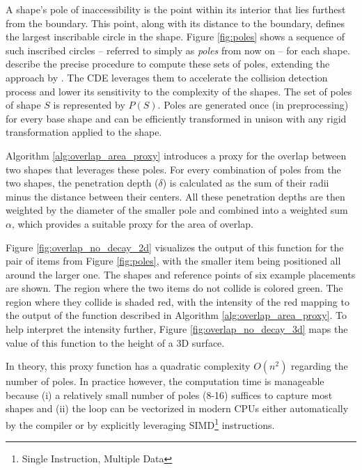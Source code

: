 \documentclass[preprint, 11pt, authoryear]{elsarticle}
\begin{document}


A shape's pole of inaccessibility is the point within its interior that lies furthest from the boundary.
This point, along with its distance to the boundary, defines the largest inscribable circle in the shape.
Figure \ref{fig:poles} shows a sequence of such inscribed circles -- referred to simply as \emph{poles} from now on -- for each shape. \citet{gardeyn2025decoupling} describe the precise procedure to compute these sets of poles, extending the approach by \citet{Agafonkin_Polylabel_a_fast_2016}.
The CDE leverages them to accelerate the collision detection process and lower its sensitivity to the complexity of the shapes.
The set of poles of shape $S$ is represented by $P(S)$.
Poles are generated once (in preprocessing) for every base shape and can be efficiently transformed in unison with any rigid transformation applied to the shape.



Algorithm \ref{alg:overlap_area_proxy} introduces a proxy for the overlap between two shapes that leverages these poles.
For every combination of poles from the two shapes, the penetration depth ($\delta$) is calculated as the sum of their radii minus the distance between their centers.
All these penetration depths are then weighted by the diameter of the smaller pole and combined into a weighted sum $\alpha$, which provides a suitable proxy for the area of overlap.



Figure \ref{fig:overlap_no_decay_2d} visualizes the output of this function for the pair of items from Figure \ref{fig:poles}, with the smaller item being positioned all around the larger one. 
The shapes and reference points of six example placements are shown.
The region where the two items do not collide is colored green.
The region where they collide is shaded red, with the intensity of the red mapping to the output of the function described in Algorithm \ref{alg:overlap_area_proxy}.
To help interpret the intensity further, Figure \ref{fig:overlap_no_decay_3d} maps the value of this function to the height of a 3D surface.

In theory, this proxy function has a quadratic complexity $O(n^2)$ regarding the number of poles.
In practice however, the computation time is manageable because (i) a relatively small number of poles (8-16) suffices to capture most shapes and (ii) the loop can be vectorized in modern CPUs either automatically by the compiler or by explicitly leveraging SIMD\footnote{Single Instruction, Multiple Data} instructions.
\end{document}
